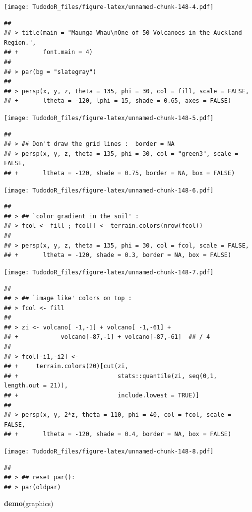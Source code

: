 \documentclass[
]{book}
\newenvironment{Shaded}{\begin{snugshade}}{\end{snugshade}}
\newcommand{\KeywordTok}[1]{\textcolor[rgb]{0.13,0.29,0.53}{\textbf{#1}}}
\newcommand{\NormalTok}[1]{#1}
\begin{document}
\texttt{[image: TudodoR\_files/figure-latex/unnamed-chunk-148-4.pdf]}

\begin{verbatim}
## 
## > title(main = "Maunga Whau\nOne of 50 Volcanoes in the Auckland Region.",
## +       font.main = 4)
## 
## > par(bg = "slategray")
## 
## > persp(x, y, z, theta = 135, phi = 30, col = fill, scale = FALSE,
## +       ltheta = -120, lphi = 15, shade = 0.65, axes = FALSE)
\end{verbatim}

\texttt{[image: TudodoR\_files/figure-latex/unnamed-chunk-148-5.pdf]}

\begin{verbatim}
## 
## > ## Don't draw the grid lines :  border = NA
## > persp(x, y, z, theta = 135, phi = 30, col = "green3", scale = FALSE,
## +       ltheta = -120, shade = 0.75, border = NA, box = FALSE)
\end{verbatim}

\texttt{[image: TudodoR\_files/figure-latex/unnamed-chunk-148-6.pdf]}

\begin{verbatim}
## 
## > ## `color gradient in the soil' :
## > fcol <- fill ; fcol[] <- terrain.colors(nrow(fcol))
## 
## > persp(x, y, z, theta = 135, phi = 30, col = fcol, scale = FALSE,
## +       ltheta = -120, shade = 0.3, border = NA, box = FALSE)
\end{verbatim}

\texttt{[image: TudodoR\_files/figure-latex/unnamed-chunk-148-7.pdf]}

\begin{verbatim}
## 
## > ## `image like' colors on top :
## > fcol <- fill
## 
## > zi <- volcano[ -1,-1] + volcano[ -1,-61] +
## +            volcano[-87,-1] + volcano[-87,-61]  ## / 4
## 
## > fcol[-i1,-i2] <-
## +     terrain.colors(20)[cut(zi,
## +                            stats::quantile(zi, seq(0,1, length.out = 21)),
## +                            include.lowest = TRUE)]
## 
## > persp(x, y, 2*z, theta = 110, phi = 40, col = fcol, scale = FALSE,
## +       ltheta = -120, shade = 0.4, border = NA, box = FALSE)
\end{verbatim}

\texttt{[image: TudodoR\_files/figure-latex/unnamed-chunk-148-8.pdf]}

\begin{verbatim}
## 
## > ## reset par():
## > par(oldpar)
\end{verbatim}

\begin{Shaded}
\begin{Highlighting}[]
\KeywordTok{demo}\NormalTok{(graphics)}
\end{Highlighting}
\end{Shaded}
\end{document}
